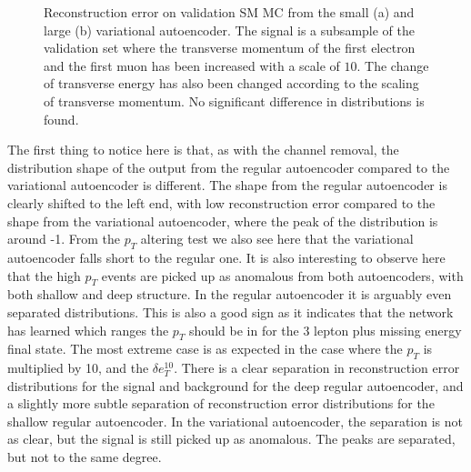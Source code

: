\begin{figure}[H]
\begin{subfigure}{.45\textwidth}
        \caption{}
        \label{fig:VAE_big_pt_10}
    \end{subfigure}
    \hfill 
    \caption[VAE | Reconstruction error $p_T$ altering of 10]{Reconstruction error on validation SM MC from the small (a) and large (b) variational autoencoder. The signal is a subsample of the validation 
    set where the transverse momentum of the first electron and the first muon has been increased with a scale of $10$. The change of transverse 
    energy has also been changed according to the scaling of transverse momentum. No significant difference in distributions is found. }
    \label{fig:VAE_big_small_pt_10}
\end{figure}

The first thing to notice here is that, as with the channel removal, the distribution shape of the output from the regular autoencoder compared to the
variational autoencoder is different. The shape from the regular autoencoder is clearly shifted to the left end, with low reconstruction error compared 
to the shape from the variational autoencoder, where the peak of the distribution is around -1. From the $p_T$ altering test we also see here that the 
variational autoencoder falls short to the regular one. It is also interesting to observe here that the high $p_T$ events are picked up as anomalous from both
autoencoders, with both shallow and deep structure. In the regular autoencoder it is arguably even separated distributions. This is also a good sign as it 
indicates that the network has learned which ranges the $p_T$ should be in for the 3 lepton plus missing energy final state. The most extreme case is 
as expected in the case where the $p_T$ is multiplied by 10, and the $\delta e_T^{10}$. There is a clear separation in reconstruction error distributions for the
signal and background for the deep regular autoencoder, and a slightly more subtle separation of reconstruction error distributions for the shallow regular autoencoder.
In the variational autoencoder, the separation is not as clear, but the signal is still picked up as anomalous. The peaks are separated, but not to the same degree. 

